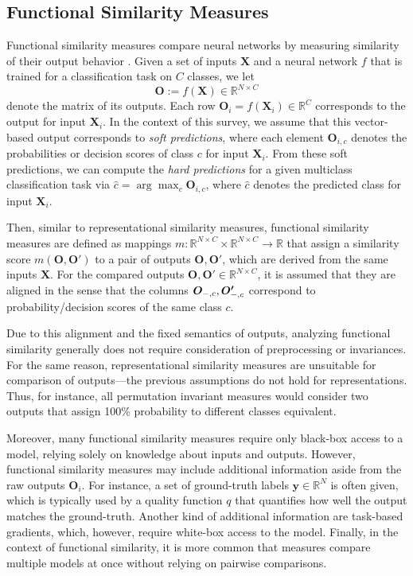\documentclass{article}
\newcommand{\Real}{\mathbb{R}}
\newcommand{\Out}{\bm{O}}
\newcommand{\Outp}{\bm{O'}}
\begin{document}
\subsection{Functional Similarity Measures}\label{subsec:funcsim_intro}
Functional similarity measures compare neural networks by measuring similarity of their output behavior \cite{csiszarik_similarity_2021}.
Given a set of inputs  $\bm{X}$ and a neural network $f$ that is trained for a classification task on $C$ classes, we let
\begin{equation}
  \bm{O} := f(\bm{X}) \in \mathbb{R}^{N \times C}
\end{equation}
denote the matrix of its outputs.
Each row $\Out_i=f(\bm{X}_i)\in\Real^C$ corresponds to the output for input $\bm{X}_i$.
In the context of this survey, we assume that this vector-based output corresponds to \emph{soft predictions}, where each element  $\Out_{i,c}$ denotes the probabilities or decision scores of class $c$ for input $\bm{X}_i$.
From these soft predictions, we can compute the \emph{hard predictions} for a given multiclass classification task via $\hat{c} = \arg\max_c \Out_{i,c}$, where $\hat{c}$ denotes the predicted class for input $\bm{X}_i$.

Then, similar to representational similarity measures, functional similarity measures are defined as mappings $m: \Real^{N\times C}\times \Real^{N\times C} \longrightarrow \Real$ that assign a similarity score $m(\Out,\Outp)$ to a pair of outputs $\Out,\Outp$, which are derived from the same inputs $\bm{X}$.
For the compared outputs $\Out, \Outp \in \Real^{N\times C}$, it is assumed that they are aligned in the sense that the columns $\Out_{\--, c}, \Outp_{\--, c}$ correspond to probability/decision scores of the same class $c$.

Due to this alignment and the fixed semantics of outputs, analyzing functional similarity generally does not require consideration of preprocessing or invariances.
For the same reason, representational similarity measures are unsuitable for comparison of outputs---the previous assumptions do not hold for representations.
Thus, for instance, all permutation invariant measures would consider two outputs that assign 100\% probability to different classes equivalent.

Moreover, many functional similarity measures require only black-box access to a model, relying solely on knowledge about inputs and outputs.
However, functional similarity measures may include additional information aside from the raw outputs $\Out_i$.
For instance, a set of ground-truth labels $\bm{y}\in\Real^N$ is often given, which is typically used by a quality function $q$ that quantifies how well the output matches the ground-truth.
Another kind of additional information are task-based gradients, which, however, require white-box access to the model.
Finally, in the context of functional similarity, it is more common that measures compare multiple models at once without relying on pairwise comparisons.
\end{document}
